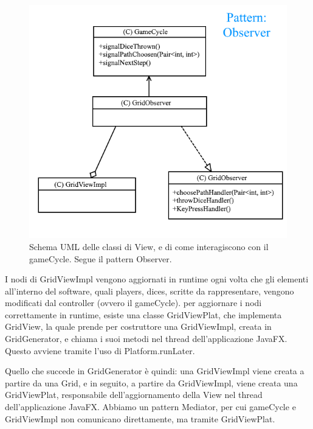 \documentclass[a4paper,12pt]{report}
\begin{document}
\begin{figure}[!t]
\centering{}
\includegraphics[width=\textwidth]{images/gridImages/gridObserver.png}
\caption{Schema UML delle classi di View, e di come interagiscono con il gameCycle. Segue il pattern Observer.}
\label{img:gridobserver}
\end{figure}

I nodi di GridViewImpl vengono aggiornati in runtime ogni volta che gli elementi all’interno del software, quali players, dices, scritte da rappresentare, vengono modificati dal controller (ovvero il gameCycle).
%
per aggiornare i nodi correttamente in runtime, esiste una classe GridViewPlat, che implementa GridView, la quale prende per costruttore una GridViewImpl, creata in GridGenerator, e chiama i suoi metodi nel thread dell’applicazione JavaFX.
%
Questo avviene tramite l’uso di Platform.runLater.

Quello che succede in GridGenerator è quindi: una GridViewImpl viene creata a partire da una Grid, e in seguito, a partire da GridViewImpl, viene creata una GridViewPlat, responsabile dell’aggiornamento della View nel thread dell’applicazione JavaFX.
%
Abbiamo un pattern Mediator, per cui gameCycle e GridViewImpl non comunicano direttamente, ma tramite GridViewPlat.
\end{document}
